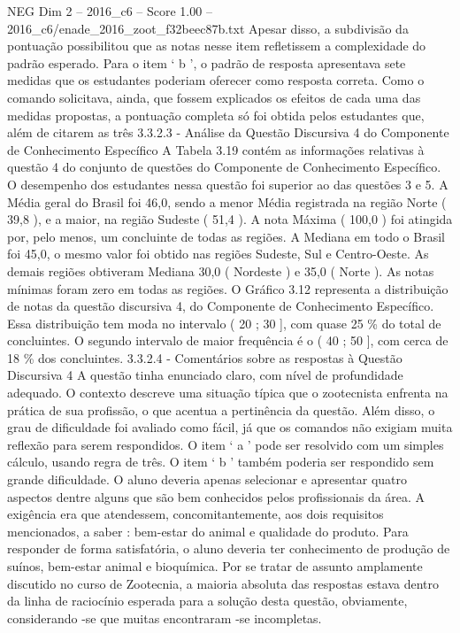 \begin{textsample}{NEG Dim 2 – 2016\_c6 – Score 1.00 – 2016\_c6/enade\_2016\_zoot\_f32beec87b.txt}
Apesar disso, a subdivisão da pontuação possibilitou que as notas nesse item refletissem a complexidade do padrão esperado.
Para o item ‘ b ’, o padrão de resposta apresentava sete medidas que os estudantes poderiam oferecer como resposta correta.
Como o comando solicitava, ainda, que fossem explicados os efeitos de cada uma das medidas propostas, a pontuação completa só foi obtida pelos estudantes que, além de citarem as três 3.3.2.3 - Análise da Questão Discursiva 4 do Componente de Conhecimento Específico A Tabela 3.19 contém as informações relativas à questão 4 do conjunto de questões do Componente de Conhecimento Específico.
O desempenho dos estudantes nessa questão foi superior ao das questões 3 e 5.
A Média geral do Brasil foi 46,0, sendo a menor Média registrada na região Norte ( 39,8 ), e a maior, na região Sudeste ( 51,4 ).
A nota Máxima ( 100,0 ) foi atingida por, pelo menos, um concluinte de todas as regiões.
A Mediana em todo o Brasil foi 45,0, o mesmo valor foi obtido nas regiões Sudeste, Sul e Centro-Oeste.
As demais regiões obtiveram Mediana 30,0 ( Nordeste ) e 35,0 ( Norte ).
As notas mínimas foram zero em todas as regiões.
O Gráfico 3.12 representa a distribuição de notas da questão discursiva 4, do Componente de Conhecimento Específico.
Essa distribuição tem moda no intervalo ( 20 ; 30 ], com quase 25 \% do total de concluintes.
O segundo intervalo de maior frequência é o ( 40 ; 50 ], com cerca de 18 \% dos concluintes. 3.3.2.4 - Comentários sobre as respostas à Questão Discursiva 4 A questão tinha enunciado claro, com nível de profundidade adequado.
O contexto descreve uma situação típica que o zootecnista enfrenta na prática de sua profissão, o que acentua a pertinência da questão.
Além disso, o grau de dificuldade foi avaliado como fácil, já que os comandos não exigiam muita reflexão para serem respondidos.
O item ‘ a ’ pode ser resolvido com um simples cálculo, usando regra de três.
O item ‘ b ’ também poderia ser respondido sem grande dificuldade.
O aluno deveria apenas selecionar e apresentar quatro aspectos dentre alguns que são bem conhecidos pelos profissionais da área.
A exigência era que atendessem, concomitantemente, aos dois requisitos mencionados, a saber : bem-estar do animal e qualidade do produto.
Para responder de forma satisfatória, o aluno deveria ter conhecimento de produção de suínos, bem-estar animal e bioquímica.
Por se tratar de assunto amplamente discutido no curso de Zootecnia, a maioria absoluta das respostas estava dentro da linha de raciocínio esperada para a solução desta questão, obviamente, considerando -se que muitas encontraram -se incompletas.

\end{textsample}

